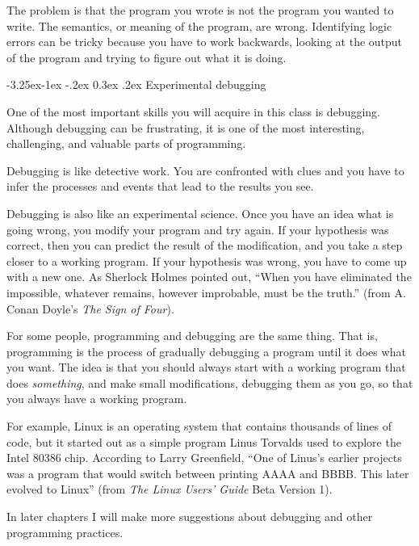 \documentclass{book}
\makeatletter
\renewcommand\subsection{\@startsection {subsection}{2}{0mm}%
    {-3.25ex\@plus -1ex \@minus -.2ex}%
    {0.3ex \@plus .2ex}%
    {\normalfont\large\bfseries}}
\makeatother
\begin{document}
The problem is that the program you wrote is not the program you
wanted to write.  The semantics, or meaning of the program, are wrong.
Identifying logic errors can be tricky because you have to work
backwards, looking at the output of the program and trying to figure
out what it is doing.

\subsection{Experimental debugging}

One of the most important skills you will acquire in this
class is debugging.  Although debugging can be frustrating, it
is one of the most interesting, challenging, and
valuable parts of programming.

Debugging is like detective work.  You are
confronted with clues and you have to infer the processes
and events that lead to the results you see.

Debugging is also like an experimental science.  Once you have an idea
what is going wrong, you modify your program and try again.  If your
hypothesis was correct, then you can predict the result of the
modification, and you take a step closer to a working program.  If
your hypothesis was wrong, you have to come up with a new one.  As
Sherlock Holmes pointed out, ``When you have eliminated the
impossible, whatever remains, however improbable, must be the truth.''
(from A. Conan Doyle's {\em The Sign of Four}).


For some people, programming and debugging are the
same thing.  That is, programming is the process of gradually
debugging a program until it does what you want.  The idea
is that you should always start with a working program that
does {\em something}, and make small modifications, debugging
them as you go, so that you always have a working program.

For example, Linux is an operating system that contains thousands of
lines of code, but it started out as a simple program Linus Torvalds
used to explore the Intel 80386 chip.  According to Larry Greenfield,
``One of Linus's earlier projects was a program that would switch
between printing AAAA and BBBB.  This later evolved to Linux''
(from {\em The Linux Users' Guide} Beta Version 1).


In later chapters I will make more suggestions about debugging
and other programming practices.
\end{document}
